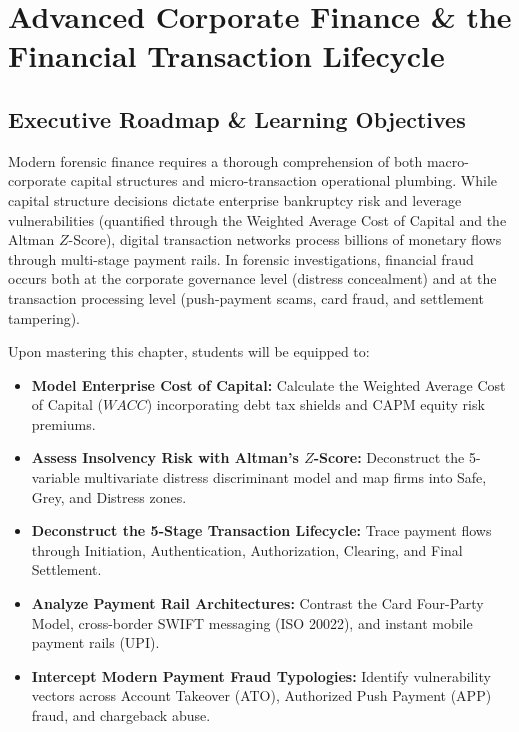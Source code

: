 \chapter{Advanced Corporate Finance \& the Financial Transaction Lifecycle}

\section{Executive Roadmap \& Learning Objectives}

Modern forensic finance requires a thorough comprehension of both macro-corporate capital structures and micro-transaction operational plumbing. While capital structure decisions dictate enterprise bankruptcy risk and leverage vulnerabilities (quantified through the Weighted Average Cost of Capital and the Altman $Z$-Score), digital transaction networks process billions of monetary flows through multi-stage payment rails. In forensic investigations, financial fraud occurs both at the corporate governance level (distress concealment) and at the transaction processing level (push-payment scams, card fraud, and settlement tampering).

\begin{tcolorbox}[colback=primarylight, colframe=primarydark, title={\textbf{Core Learning Competencies}}]
Upon mastering this chapter, students will be equipped to:
\begin{itemize}
    \item \textbf{Model Enterprise Cost of Capital:} Calculate the Weighted Average Cost of Capital ($WACC$) incorporating debt tax shields and CAPM equity risk premiums.
    \item \textbf{Assess Insolvency Risk with Altman's $Z$-Score:} Deconstruct the 5-variable multivariate distress discriminant model and map firms into Safe, Grey, and Distress zones.
    \item \textbf{Deconstruct the 5-Stage Transaction Lifecycle:} Trace payment flows through Initiation, Authentication, Authorization, Clearing, and Final Settlement.
    \item \textbf{Analyze Payment Rail Architectures:} Contrast the Card Four-Party Model, cross-border SWIFT messaging (ISO 20022), and instant mobile payment rails (UPI).
    \item \textbf{Intercept Modern Payment Fraud Typologies:} Identify vulnerability vectors across Account Takeover (ATO), Authorized Push Payment (APP) fraud, and chargeback abuse.
\end{itemize}
\end{tcolorbox}


